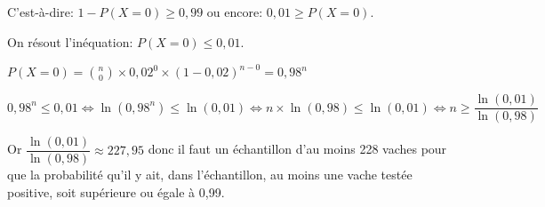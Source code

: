 \documentclass[10pt]{article}
\providecommand{\ds}{\displaystyle}
\begin{document}
\begin{enumerate}
C'est-à-dire:
$1-P(X=0) \geqslant 0,99$
ou encore:
$0,01\geqslant P(X=0)$.

On résout l'inéquation: $P(X=0)\leqslant 0,01$.

$P(X=0) = \ds\binom{n}{0}\times 0,02^{0}\times (1-0,02)^{n-0}=0,98^n$

$0,98^n \leqslant 0,01
\iff
\ln\left (0,98^n\right ) \leqslant \ln(0,01)
\iff
n\times \ln (0,98 ) \leqslant \ln(0,01)
\iff
n \geqslant \dfrac{\ln(0,01)}{\ln(0,98)}$

Or $\dfrac{\ln(0,01)}{\ln(0,98)} \approx 227,95$
donc il faut un échantillon d'au moins 228 vaches pour que la probabilité qu'il y ait, dans l'échantillon, au moins une vache testée positive, soit supérieure ou égale à 0,99.

\end{enumerate}

\vspace{1cm}
\end{document}
